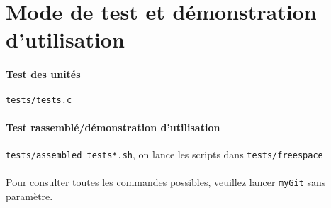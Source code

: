 \documentclass{report}
\begin{document}
\section*{Mode de test et démonstration d'utilisation}

\paragraph{Test des unités} \verb|tests/tests.c|
\paragraph{Test rassemblé/démonstration d'utilisation}\verb|tests/assembled_tests*.sh|, 
on lance les scripts dans \verb|tests/freespace|

\paragraph{}Pour consulter toutes les commandes possibles, veuillez lancer \verb|myGit| sans paramètre.
\end{document}

